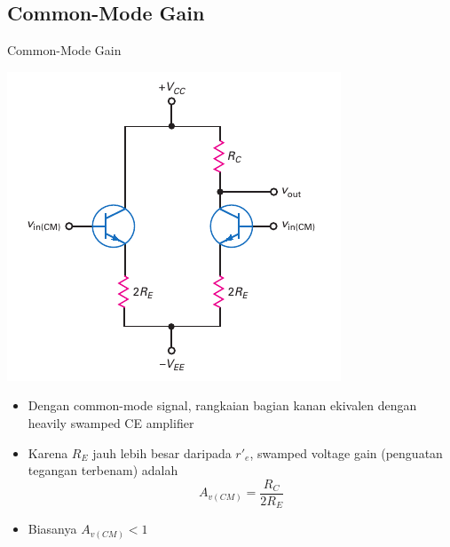 \documentclass[aspectratio=169]{beamer}
\begin{document}
\subsection{Common-Mode Gain}
\begin{frame}{Common-Mode Gain}
	\begin{multicols}{2}
		\begin{center}
			\includegraphics[height=0.7\textheight]{gambar/01.fig20}
		\end{center}
		\columnbreak
		\begin{itemize}
			\item Dengan common-mode signal, rangkaian bagian kanan ekivalen dengan heavily swamped CE amplifier
			\item Karena $ R_E $ jauh lebih besar daripada $ r'_e $, swamped voltage gain (penguatan tegangan terbenam) adalah
			\begin{equation}\label{pers.20}
				A_{v(CM)} = \frac{R_C}{2R_E}
			\end{equation}
			\item Biasanya $ A_{v(CM)} < 1 $
		\end{itemize}
	\end{multicols}
\end{frame}
\end{document}

